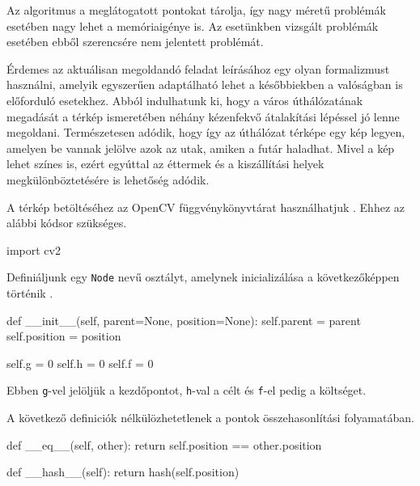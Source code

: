 Az algoritmus a meglátogatott pontokat tárolja, így nagy méretű problémák esetében nagy lehet a memóriaigénye is.
Az esetünkben vizsgált problémák esetében ebből szerencsére nem jelentett problémát. 


Érdemes az aktuálisan megoldandó feladat leírásához egy olyan formalizmust használni, amelyik egyszerűen adaptálható lehet a későbbiekben a valóságban is előforduló esetekhez.
Abból indulhatunk ki, hogy a város úthálózatának megadását a térkép ismeretében néhány kézenfekvő átalakítási lépéssel jó lenne megoldani.
Természetesen adódik, hogy így az úthálózat térképe egy kép legyen, amelyen be vannak jelölve azok az utak, amiken a futár haladhat.
Mivel a kép lehet színes is, ezért egyúttal az éttermek és a kiszállítási helyek megkülönböztetésére is lehetőség adódik.

A térkép betöltéséhez az OpenCV függvénykönyvtárat használhatjuk \cite{PythonOpenCV}.
Ehhez az alábbi kódsor szükséges.
\begin{python}
import cv2
\end{python}

Definiáljunk egy \texttt{Node} nevű osztályt, amelynek inicializálása a következőképpen történik \cite{Python}.
\begin{python}
def __init__(self, parent=None, position=None):
    self.parent = parent
    self.position = position

    self.g = 0
    self.h = 0
    self.f = 0
\end{python}
Ebben \texttt{g}-vel jelöljük a kezdőpontot, \texttt{h}-val a célt és \texttt{f}-el pedig a költséget.

A következő definiciók nélkülözhetetlenek a pontok összehasonlítási folyamatában.

\begin{python}
def __eq__(self, other):
    return self.position == other.position

def __hash__(self):
    return hash(self.position)
\end{python}

